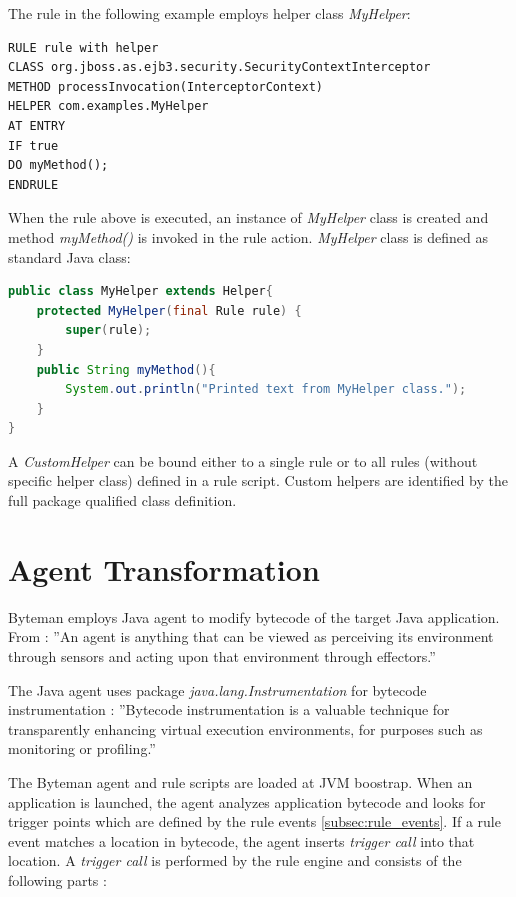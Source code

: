 \documentclass[12pt,oneside]{fithesis2}
\begin{document}
The rule in the following example employs helper class \textit{MyHelper}:
\begin{lstlisting}[caption = Rule with user-defined helper class, label = rule_with_helper]
RULE rule with helper
CLASS org.jboss.as.ejb3.security.SecurityContextInterceptor
METHOD processInvocation(InterceptorContext)
HELPER com.examples.MyHelper
AT ENTRY
IF true
DO myMethod();
ENDRULE
\end{lstlisting}

When the rule above is executed, an instance of \textit{MyHelper} class is created and method \textit{myMethod()} is invoked in the rule action. \textit{MyHelper} class is defined as standard Java class:
\begin{lstlisting}[caption = User-Defined helper class, label = rule_helper, language=Java]
public class MyHelper extends Helper{
	protected MyHelper(final Rule rule) {
		super(rule);
	}
	public String myMethod(){
		System.out.println("Printed text from MyHelper class.");
	}
}
\end{lstlisting}

A \textit{CustomHelper} can be bound either to a single rule or to all rules (without specific helper class) defined in a rule script. Custom helpers are identified by the full package qualified class definition.

\section{Agent Transformation}
Byteman employs Java agent to modify bytecode of the target Java application. From \cite{agent_def}: ''An agent is anything that can be viewed as perceiving its environment through sensors and acting upon that environment through effectors.''

The Java agent uses package \textit{java.lang.Instrumentation} for bytecode instrumentation \cite{instrumentation}: ''Bytecode instrumentation is a valuable technique for transparently enhancing virtual execution environments, for purposes such as monitoring or profiling.''

The Byteman agent and rule scripts are loaded at JVM boostrap. When an application is launched, the agent analyzes application bytecode and looks for trigger points which are defined by the rule events \ref{subsec:rule_events}. If a rule event matches a location in bytecode, the agent inserts \textit{trigger call} into that location. A \textit{trigger call} is performed by the rule engine and consists of the following parts \cite[Agent Transformation]{byteman_doc}:
\end{document}
